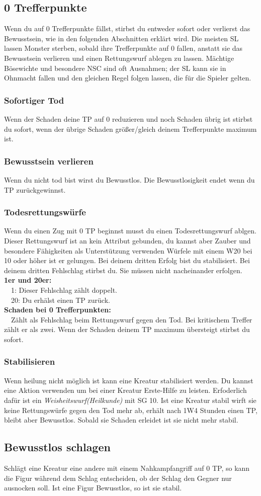 \subsection{0 Trefferpunkte}
Wenn du auf 0 Trefferpunkte fällst, stirbst du entweder sofort oder verlierst das Bewusstsein, wie in den folgenden Abschnitten erklärt wird. Die meisten SL lassen Monster sterben, sobald ihre Trefferpunkte auf 0 fallen, anstatt sie das Bewusstsein verlieren und einen Rettungswurf ablegen zu lassen. Mächtige Bösewichte und besondere NSC sind oft Ausnahmen; der SL kann sie in Ohnmacht fallen und den gleichen Regel folgen lassen, die für die Spieler gelten.

\subsubsection{Sofortiger Tod}
Wenn der Schaden deine TP auf 0 reduzieren und noch Schaden übrig ist stirbst du sofort, wenn der übrige Schaden größer/gleich deinem Trefferpunkte maximum ist.

\subsubsection{Bewusstsein verlieren}
Wenn du nicht tod bist wirst du Bewusstlos. Die Bewusstlosigkeit endet wenn du TP zurückgewinnst.

\subsubsection{Todesrettungswürfe}
Wenn du einen Zug mit 0 TP beginnst musst du einen Todesrettungswurf ablgen. Dieser Rettungswurf ist an kein Attribut gebunden, du kannst aber Zauber und besondere Fähigkeiten als Unterstützung verwenden Würfele mit einem W20 bei 10 oder höher ist er gelungen. Bei deinem dritten Erfolg bist du stabilisiert. Bei deinem dritten Fehlschlag stirbst du. Sie müssen nicht nacheinander erfolgen.\\
\noindent \textbf{1er und 20er:}\\
\ \ 1: Dieser Fehlschlag zählt doppelt.\\
\ \ 20: Du erhälst einen TP zurück.\\
\noindent \textbf{Schaden bei 0 Trefferpunkten:}\\
\ \ Zählt als Fehlschlag beim Rettungswurf gegen den Tod. Bei kritischem Treffer zählt er als zwei. Wenn der Schaden deinem TP maximum übersteigt stirbst du sofort.

\subsubsection{Stabilisieren}
Wenn heilung nicht möglich ist kann eine Kreatur stabilisiert werden. Du kannst eine Aktion verwenden um bei einer Kreatur Erste-Hilfe zu leisten. Erfoderlich dafür ist ein \textit{Weisheitswurf(Heilkunde)} mit SG 10. Ist eine Kreatur stabil wirft sie keine Rettungswürfe gegen den Tod mehr ab, erhält nach 1W4 Stunden einen TP, bleibt aber Bewusstlos. Sobald sie Schaden erleidet ist sie nicht mehr stabil.

\subsection{Bewusstlos schlagen}
Schlägt eine Kreatur eine andere mit einem Nahkampfangriff auf 0 TP, so kann die Figur während dem Schlag entscheiden, ob der Schlag den Gegner nur ausnocken soll. Ist eine Figur Bewusstlos, so ist sie stabil.
